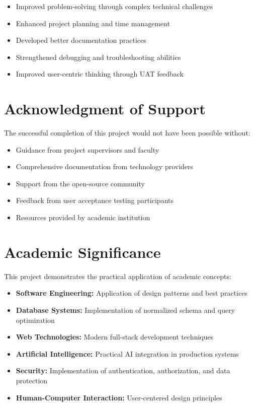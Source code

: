 \begin{itemize}
    \item Improved problem-solving through complex technical challenges
    \item Enhanced project planning and time management
    \item Developed better documentation practices
    \item Strengthened debugging and troubleshooting abilities
    \item Improved user-centric thinking through UAT feedback
\end{itemize}

\section{Acknowledgment of Support}

The successful completion of this project would not have been possible without:

\begin{itemize}
    \item Guidance from project supervisors and faculty
    \item Comprehensive documentation from technology providers
    \item Support from the open-source community
    \item Feedback from user acceptance testing participants
    \item Resources provided by academic institution
\end{itemize}

\section{Academic Significance}

This project demonstrates the practical application of academic concepts:

\begin{itemize}
    \item \textbf{Software Engineering:} Application of design patterns and best practices
    \item \textbf{Database Systems:} Implementation of normalized schema and query optimization
    \item \textbf{Web Technologies:} Modern full-stack development techniques
    \item \textbf{Artificial Intelligence:} Practical AI integration in production systems
    \item \textbf{Security:} Implementation of authentication, authorization, and data protection
    \item \textbf{Human-Computer Interaction:} User-centered design principles
\end{itemize}

